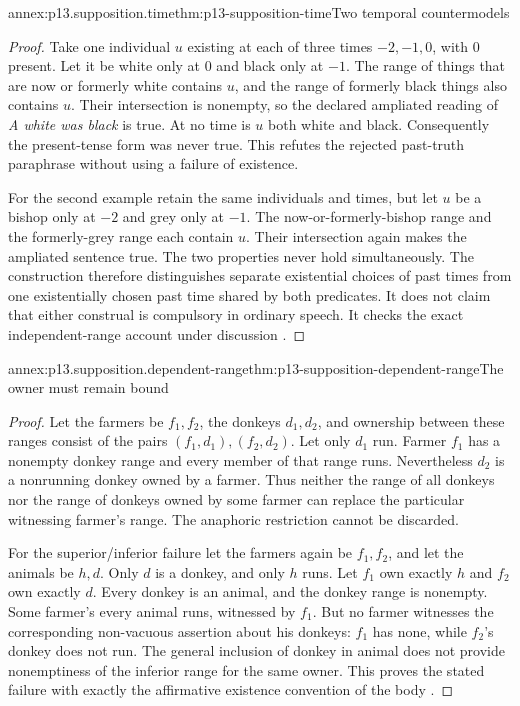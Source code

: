 \begin{annexitem}{annex:p13.supposition.time}{thm:p13-supposition-time}{Two temporal countermodels}
\begin{proof}
Take one individual \(u\) existing at each of three times
\(-2,-1,0\), with \(0\) present. Let it be white only at \(0\)
and black only at \(-1\). The range of things that are now or formerly
white contains \(u\), and the range of formerly black things also
contains \(u\). Their intersection is nonempty, so the declared
ampliated reading of \emph{A white was black} is true. At no time is
\(u\) both white and black. Consequently the present-tense form was
never true. This refutes the rejected past-truth paraphrase without
using a failure of existence.

For the second example retain the same individuals and times, but let
\(u\) be a bishop only at \(-2\) and grey only at \(-1\).
The now-or-formerly-bishop range and the formerly-grey range each
contain \(u\). Their intersection again makes the ampliated sentence
true. The two properties never hold simultaneously. The construction
therefore distinguishes separate existential choices of past times
from one existentially chosen past time shared by both predicates.
It does not claim that either construal is compulsory in ordinary
speech. It checks the exact independent-range account under discussion
\cite[pp.~206--210]{Parsons2007FordhamSupposition}.
\end{proof}
\end{annexitem}

\begin{annexitem}{annex:p13.supposition.dependent-range}{thm:p13-supposition-dependent-range}{The owner must remain bound}
\begin{proof}
Let the farmers be \(f_1,f_2\), the donkeys \(d_1,d_2\), and
ownership between these ranges consist of the pairs
\((f_1,d_1),(f_2,d_2)\). Let only \(d_1\) run. Farmer \(f_1\)
has a nonempty donkey range and every member of that range runs.
Nevertheless \(d_2\) is a nonrunning donkey owned by a farmer.
Thus neither the range of all donkeys nor the range of donkeys owned
by some farmer can replace the particular witnessing farmer's range.
The anaphoric restriction cannot be discarded.

For the superior/inferior failure let the farmers again be \(f_1,f_2\),
and let the animals be \(h,d\). Only \(d\) is a donkey, and only
\(h\) runs. Let \(f_1\) own exactly \(h\) and \(f_2\) own
exactly \(d\). Every donkey is an animal, and the donkey range is
nonempty. Some farmer's every animal runs, witnessed by \(f_1\).
But no farmer witnesses the corresponding non-vacuous assertion about
his donkeys: \(f_1\) has none, while \(f_2\)'s donkey does not run.
The general inclusion of donkey in animal does not provide nonemptiness
of the inferior range for the same owner. This proves the stated
failure with exactly the affirmative existence convention of the body
\cite[pp.~255--257]{Parsons2007FordhamSupposition}.
\end{proof}
\end{annexitem}

